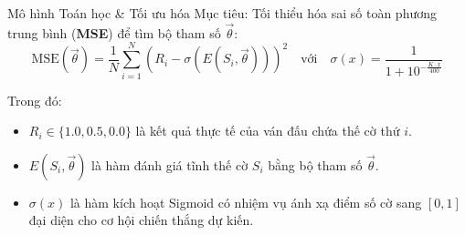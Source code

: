 \begin{frame}{Mô hình Toán học \& Tối ưu hóa}
    Mục tiêu: Tối thiểu hóa sai số toàn phương trung bình (\textbf{MSE}) để tìm bộ tham số $\vec{\theta}$:
    \vspace{-0.2cm}
    \begin{equation*}
        \text{MSE}(\vec{\theta}) = \frac{1}{N} \sum_{i=1}^{N} \left( R_i - \sigma\left(E(S_i, \vec{\theta})\right) \right)^2 \quad \text{với} \quad \sigma(x) = \frac{1}{1 + 10^{-\frac{K \cdot x}{400}}}
    \end{equation*}

    Trong đó:
\begin{itemize}
    \item<2-> $R_i \in \{1.0, 0.5, 0.0\}$ là kết quả thực tế của ván đấu chứa thế cờ thứ $i$.
    \item<3-> $E(S_i, \vec{\theta})$ là hàm đánh giá tĩnh thế cờ $S_i$ bằng bộ tham số $\vec{\theta}$.
    \item<4-> $\sigma(x)$ là hàm kích hoạt Sigmoid có nhiệm vụ ánh xạ điểm số cờ sang $[0, 1]$ đại diện cho cơ hội chiến thắng dự kiến.
\end{itemize}

\vspace{0.5cm}

\end{frame}

